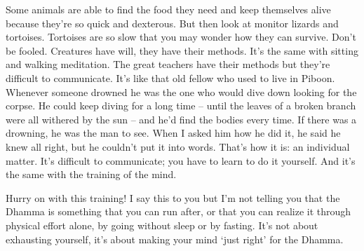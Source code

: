 Some animals are able to find the food they need and keep themselves alive because they're so quick and dexterous. But then look at monitor lizards and tortoises. Tortoises are so slow that you may wonder how they can survive. Don't be fooled. Creatures have will, they have their methods. It's the same with sitting and walking meditation. The great teachers have their methods but they're difficult to communicate. It's like that old fellow who used to live in Piboon. Whenever someone drowned he was the one who would dive down looking for the corpse. He could keep diving for a long time -- until the leaves of a broken branch were all withered by the sun -- and he'd find the bodies every time. If there was a drowning, he was the man to see. When I asked him how he did it, he said he knew all right, but he couldn't put it into words. That's how it is: an individual matter. It's difficult to communicate; you have to learn to do it yourself. And it's the same with the training of the mind.

Hurry on with this training! I say this to you but I'm not telling you that the Dhamma is something that you can run after, or that you can realize it through physical effort alone, by going without sleep or by fasting. It's not about exhausting yourself, it's about making your mind `just right' for the Dhamma.

